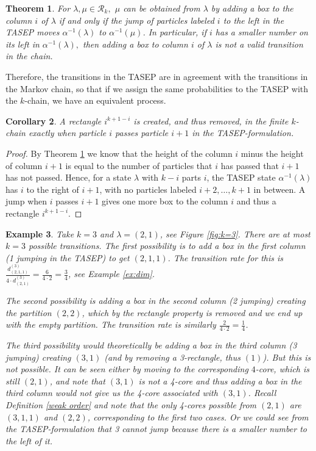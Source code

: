 \documentclass[11pt]{amsart}
\newtheorem{theorem}{Theorem}[section]
\newtheorem{corollary}[theorem]{Corollary}
\newtheorem{example}[theorem]{Example}
\begin{document}
\begin{theorem}\label{thm:TASEP}
For $\lambda,\mu \in \mathcal{R}_k,$ $\mu$ can be obtained from $\lambda$ by adding a box to the column $i$ of $\lambda$ if and only if the jump of particles labeled $i$ to the left in the TASEP moves $\alpha^{-1}(\lambda)$ to $\alpha^{-1}(\mu)$. In particular, if $i$ has a smaller number on its left in $\alpha^{-1}(\lambda),$ then adding a box to column $i$ of $\lambda$ is not a valid transition in the chain. 
\end{theorem}
Therefore, the transitions in the TASEP are in agreement with the transitions in the Markov chain, so that if we assign the same probabilities to the TASEP with the $k$-chain, we have an equivalent process. 
\begin{corollary}
    A rectangle $i^{k+1-i}$ is created, and thus removed, in the finite $k$-chain exactly when particle $i$ passes particle $i+1$ in the TASEP-formulation.
\end{corollary}
\begin{proof}
    By Theorem \ref{thm:TASEP} we know that the height of the column $i$ minus the height of column $i+1$ is equal to the number of particles that $i$ has passed that $i+1$ has not passed. Hence, for a state $\lambda$ with $k-i$ parts $i$, the TASEP state $\alpha^{-1}(\lambda)$ has  
    $i$ to the right of $i+1$, with no particles labeled $i+2,\dots,k+1$ in between. A jump when $i$ passes $i+1$ gives one more box to the column $i$ and thus a rectangle $i^{k+1-i}$.
\end{proof}

\begin{example}
    Take $k=3$ and $\lambda=(2,1)$, see Figure \ref{fig:k=3}. There are at most $k=3$ possible transitions. The first possibility is to add a box in the first column (1 jumping in the TASEP) to get $(2,1,1)$. The transition rate for this is $\frac{d^{(3)}_{(2,1,1)}}{4\cdot d^{(3)}_{(2,1)}}=\frac{6}{4\cdot 2}=\frac{3}{4}$, see Example \ref{ex:dim}.

    
    The second possibility is adding a box in the second column (2 jumping) creating the partition $(2,2)$, which by the rectangle property is removed and we end up with the empty partition. The transition rate is similarly $\frac{2}{4\cdot 2}=\frac{1}{4}$.
    
    The third possibility would theoretically be adding a box in the third column (3 jumping) creating $(3,1)$ (and by removing a 3-rectangle, thus $(1)$). But this is not possible. 
    It can be seen either by moving to the corresponding $4$-core, 
    which is still $(2,1)$, and note that $(3,1)$ is not a 4-core and thus adding a box in the third column would not give us the 4-core associated with $(3,1)$.  Recall Definition \ref{weak order} and note that the only 4-cores possible from $(2,1)$ are $(3,1,1)$ and $(2,2)$, corresponding to the first two cases. Or we could see from the TASEP-formulation that 3 cannot jump because there is a smaller number to the left of it.
\end{example}
\end{document}

